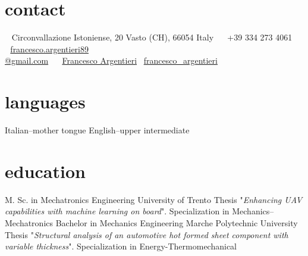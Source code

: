 \documentclass[a4,oneside]{friggeri-cv} %
\newcommand{\LinkedinColour}{{\color{linkedin} \faLinkedin}}
\newcommand{\Email}{{\color{black} \faEnvelope \,}}
\newcommand{\Skype}{{\color{skypeblue} \faSkype}}
\newcommand{\Phone}{{\color{phonegreen} \faPhone}}
\begin{document}


\begin{aside} %
  \section{contact}
  ~
  Circonvallazione Istoniense, 20
  Vasto (CH), 66054
  Italy
  ~
  \Phone \, +39 334 273 4061
  ~
  \Email \, \href{mailto:francesco.argentieri89@gmail.com}{francesco.argentieri89\\@gmail.com}
  ~
  \LinkedinColour \, \href{https://it.linkedin.com/in/francesco-argentieri}{Francesco Argentieri}
  \Skype \, \href{skype:my_username?add}{francesco\_argentieri}
  \section{languages}
  Italian--mother tongue
  English--upper intermediate
\end{aside}


\section{education}
  \begin{entrylist}
    {M. Sc. {\normalfont in Mechatronics Engineering}}
    {University of Trento}
    {Thesis "\emph{Enhancing UAV capabilities with machine learning on board}".}
    {Specialization in Mechanics--Mechatronics}
    {Bachelor {\normalfont in Mechanics Engineering}}
    {Marche Polytechnic University}
    {Thesis "\emph{Structural analysis of an automotive hot formed sheet component with variable thickness}".}
    {Specialization in Energy-Thermomechanical}
  \end{entrylist}
\end{document}
